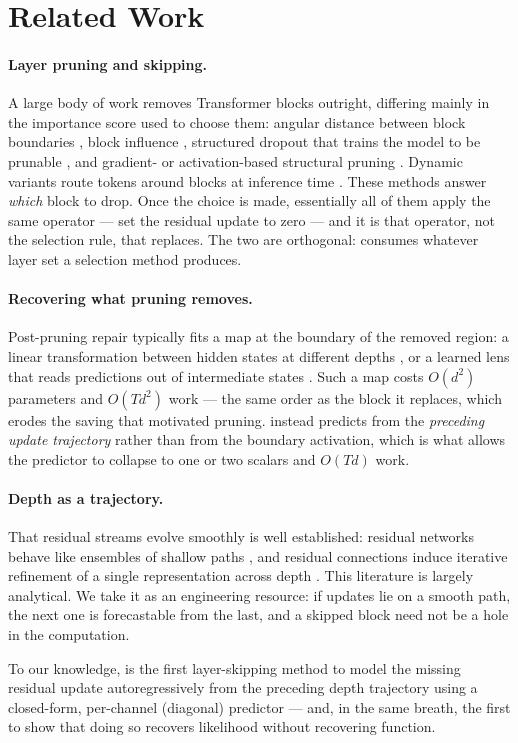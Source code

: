 \section{Related Work}
\label{sec:related-works}

\paragraph{Layer pruning and skipping.} A large body of work removes Transformer
blocks outright, differing mainly in the importance score used to choose them:
angular distance between block boundaries \citep{gromov2024unreasonable}, block
influence \citep{men2024shortgpt}, structured dropout that trains the model to be
prunable \citep{fan2020reducing}, and gradient- or activation-based structural
pruning \citep{ma2023llmpruner, frantar2023sparsegpt, sun2024simple}. Dynamic
variants route tokens around blocks at inference time
\citep{raposo2024mixture, elhoushi2024layerskip, schuster2022confident}. These
methods answer \emph{which} block to drop. Once the choice is made, essentially
all of them apply the same operator --- set the residual update to zero --- and it
is that operator, not the selection rule, that \mname replaces. The two are
orthogonal: \mname consumes whatever layer set a selection method produces.

\paragraph{Recovering what pruning removes.} Post-pruning repair typically fits a
map at the boundary of the removed region: a linear transformation between hidden
states at different depths \citep{din2023jump}, or a learned lens that reads
predictions out of intermediate states \citep{belrose2023eliciting}. Such a map
costs $O(d^2)$ parameters and $O(Td^2)$ work --- the same order as the block it
replaces, which erodes the saving that motivated pruning. \mname instead
predicts from the \emph{preceding update trajectory} rather than from the
boundary activation, which is what allows the predictor to collapse to one or two
scalars and $O(Td)$ work.

\paragraph{Depth as a trajectory.} That residual streams evolve smoothly is well
established: residual networks behave like ensembles of shallow paths
\citep{veit2016residual}, and residual connections induce iterative refinement of
a single representation across depth \citep{jastrzebski2018residual}. This
literature is largely analytical. We take it as an engineering resource: if
updates lie on a smooth path, the next one is forecastable from the last, and a
skipped block need not be a hole in the computation.

To our knowledge, \mname is the first layer-skipping method to model the missing
residual update autoregressively from the preceding depth trajectory using a
closed-form, per-channel (diagonal) predictor --- and, in the same breath, the first to
show that doing so recovers likelihood without recovering function.
